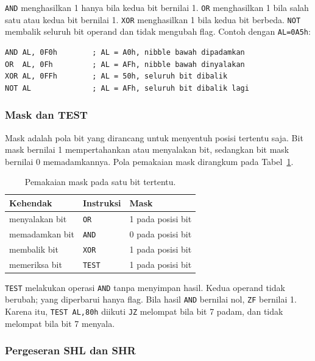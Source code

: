 \texttt{AND} menghasilkan 1 hanya bila kedua bit bernilai 1.
\texttt{OR} menghasilkan 1 bila salah satu atau kedua bit bernilai 1.
\texttt{XOR} menghasilkan 1 bila kedua bit berbeda. \texttt{NOT}
membalik seluruh bit operand dan tidak mengubah flag. Contoh dengan
\texttt{AL=0A5h}:

\begin{lstlisting}[numbers=none]
AND AL, 0F0h        ; AL = A0h, nibble bawah dipadamkan
OR  AL, 0Fh         ; AL = AFh, nibble bawah dinyalakan
XOR AL, 0FFh        ; AL = 50h, seluruh bit dibalik
NOT AL              ; AL = AFh, seluruh bit dibalik lagi
\end{lstlisting}

\subsubsection*{Mask dan TEST}

Mask adalah pola bit yang dirancang untuk menyentuh posisi tertentu
saja. Bit mask bernilai 1 mempertahankan atau menyalakan bit,
sedangkan bit mask bernilai 0 memadamkannya. Pola pemakaian mask
dirangkum pada Tabel~\ref{tab:m10-mask}.

\begin{table}[H]
    \centering
    \caption{Pemakaian mask pada satu bit tertentu.}
    \label{tab:m10-mask}
    \small
    \begin{tabular}{@{}lll@{}}
        \toprule
        \textbf{Kehendak} & \textbf{Instruksi} & \textbf{Mask} \\
        \midrule
        menyalakan bit & \texttt{OR} & 1 pada posisi bit \\
        memadamkan bit & \texttt{AND} & 0 pada posisi bit \\
        membalik bit & \texttt{XOR} & 1 pada posisi bit \\
        memeriksa bit & \texttt{TEST} & 1 pada posisi bit \\
        \bottomrule
    \end{tabular}
\end{table}

\texttt{TEST} melakukan operasi \texttt{AND} tanpa menyimpan hasil.
Kedua operand tidak berubah; yang diperbarui hanya flag. Bila hasil
\texttt{AND} bernilai nol, \texttt{ZF} bernilai 1. Karena itu,
\texttt{TEST AL,80h} diikuti \texttt{JZ} melompat bila bit 7 padam,
dan tidak melompat bila bit 7 menyala.

\subsubsection*{Pergeseran SHL dan SHR}

